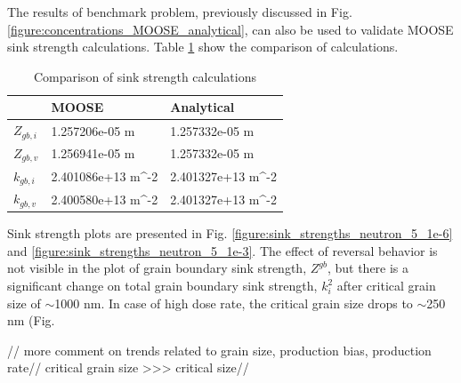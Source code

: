 \documentclass[a4paper]{article}
\begin{document}
  The results of benchmark problem, previously discussed in Fig. \ref{figure:concentrations_MOOSE_analytical}, can also be used to validate MOOSE sink strength calculations. Table \ref{table:sink_strengths_calculations} show the comparison of calculations.
    \begin{table}[h!]
      \centering
      \caption{Comparison of sink strength calculations}
      \label{table:sink_strengths_calculations}
      \begin{tabular}{ ||p{2cm}|p{3cm}|p{3cm}||  }
         \hline
          & MOOSE & Analytical\\
         \hline\hline\hline
         ${Z_{gb,i}}$  & 1.257206e-05 m & 1.257332e-05 m\\
         ${Z_{gb,v}}$  & 1.256941e-05 m & 1.257332e-05 m\\
         ${k_{gb,i}}$  & 2.401086e+13 m^{-2} & 2.401327e+13 m^{-2}\\
         ${k_{gb,v}}$  & 2.400580e+13 m^{-2} & 2.401327e+13 m^{-2}\\
         \hline
      \end{tabular}
    \end{table}
    \newpage
    Sink strength plots are presented in Fig. \ref{figure:sink_strengths_neutron_5_1e-6} and \ref{figure:sink_strengths_neutron_5_1e-3}. The effect of reversal behavior is not visible in the plot of grain boundary sink strength, ${Z^{gb}}$, but there is a significant change on total grain boundary sink strength, ${k^2_i}$ after critical grain size of ${\sim}$1000 nm. In case of high dose rate, the critical grain size drops to ${\sim}$250 nm (Fig.

    //
    more comment on trends related to grain size, production bias, production rate//
    critical grain size >>> critical size//
\end{document}

